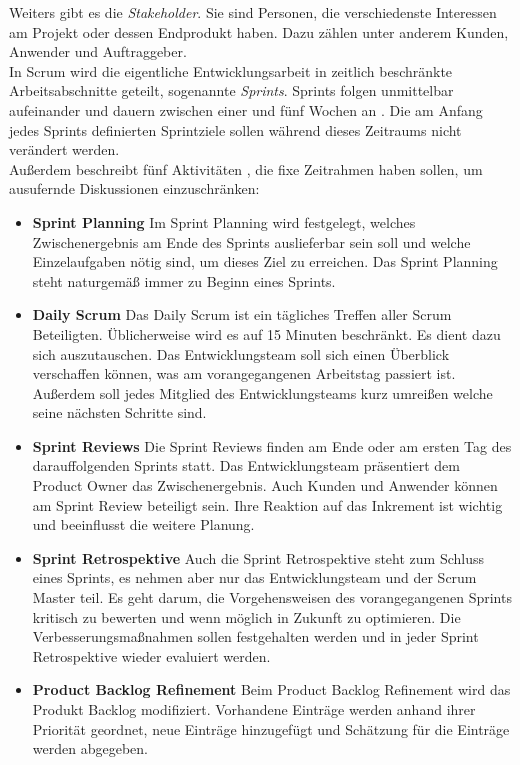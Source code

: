 Weiters gibt es die \textit{Stakeholder}. Sie sind Personen, die verschiedenste Interessen am Projekt oder dessen Endprodukt haben. Dazu zählen unter anderem Kunden, Anwender und Auftraggeber.\\
In Scrum wird die eigentliche Entwicklungsarbeit in zeitlich beschränkte Arbeitsabschnitte geteilt, sogenannte \textit{Sprints}. Sprints folgen unmittelbar aufeinander und dauern zwischen einer und fünf Wochen an \cite{linz_testing_2014}. Die am Anfang jedes Sprints definierten Sprintziele sollen während dieses Zeitraums nicht verändert werden.\\
Außerdem beschreibt \citeauthor{linz_testing_2014} fünf Aktivitäten \cite{linz_testing_2014}, die fixe Zeitrahmen haben sollen, um ausufernde Diskussionen einzuschränken:
\begin{itemize}
\item \textbf{Sprint Planning} Im Sprint Planning wird festgelegt, welches Zwischenergebnis am Ende des Sprints auslieferbar sein soll und welche Einzelaufgaben nötig sind, um dieses Ziel zu erreichen. Das Sprint Planning steht naturgemäß immer zu Beginn eines Sprints.
\item \textbf{Daily Scrum} Das Daily Scrum ist ein tägliches Treffen aller Scrum Beteiligten. Üblicherweise wird es auf 15 Minuten beschränkt. Es dient dazu sich auszutauschen. Das Entwicklungsteam soll sich einen Überblick verschaffen können, was am vorangegangenen Arbeitstag passiert ist. Außerdem soll jedes Mitglied des Entwicklungsteams kurz umreißen welche seine nächsten Schritte sind.
\item \textbf{Sprint Reviews} Die Sprint Reviews finden am Ende oder am ersten Tag des darauffolgenden Sprints statt. Das Entwicklungsteam präsentiert dem Product Owner das Zwischenergebnis. Auch Kunden und Anwender können am Sprint Review beteiligt sein. Ihre Reaktion auf das Inkrement ist wichtig und beeinflusst die weitere Planung.
\item \textbf{Sprint Retrospektive} Auch die Sprint Retrospektive steht zum Schluss eines Sprints, es nehmen aber nur das Entwicklungsteam und der Scrum Master teil. Es geht darum, die Vorgehensweisen des vorangegangenen Sprints kritisch zu bewerten und wenn möglich in Zukunft zu optimieren. Die Verbesserungsmaßnahmen sollen festgehalten werden und in jeder Sprint Retrospektive wieder evaluiert werden.
\item \textbf{Product Backlog Refinement} Beim Product Backlog Refinement wird das Produkt Backlog modifiziert. Vorhandene Einträge werden anhand ihrer Priorität geordnet, neue Einträge hinzugefügt und Schätzung für die Einträge werden abgegeben.
\end{itemize}


